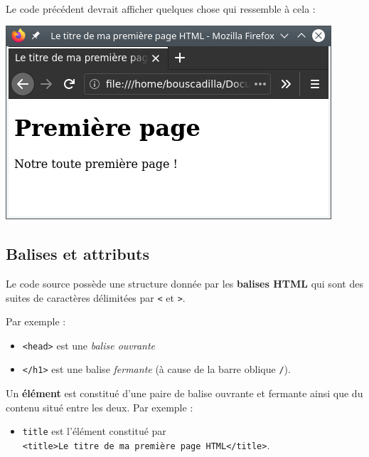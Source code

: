 \documentclass[a4paper,17pt]{extarticle}
\let\origfigure\figure
\let\endorigfigure\endfigure
\renewenvironment{figure}[1][2] {
    \expandafter\origfigure\expandafter[H]
} {
    \endorigfigure
}
\newenvironment{eleve}%
{\begin{activite}\color{noiramu}\\}
{\end{activite}}
\providecommand{\tightlist}{%
      \setlength{\itemsep}{0pt}\setlength{\parskip}{0pt}}
\begin{document}
\begin{eleve}
        \end{eleve}\begin{reponse}
    Le code précédent devrait afficher quelques chose qui ressemble à cela :

\begin{figure}
\centering
\includegraphics{res/premier_exemple.png}
\caption{Capture d'écran du premier exemple}
\end{figure}

            \end{reponse}
    \hypertarget{balises-et-attributs}{%
\subsection{Balises et attributs}\label{balises-et-attributs}}

    Le code source possède une structure donnée par les \textbf{balises
HTML} qui sont des suites de caractères délimitées par
\texttt{\textless{}} et \texttt{\textgreater{}}.

Par exemple :

\begin{itemize}
\tightlist
\item
  \texttt{\textless{}head\textgreater{}} est une \emph{balise ouvrante}
\item
  \texttt{\textless{}/h1\textgreater{}} est une balise \emph{fermante}
  (à cause de la barre oblique \texttt{/}).
\end{itemize}

Un \textbf{élément} est constitué d'une paire de balise ouvrante et
fermante ainsi que du contenu situé entre les deux. Par exemple :

\begin{itemize}
\tightlist
\item
  \texttt{title} est l'élément constitué par
  \texttt{\textless{}title\textgreater{}Le\ titre\ de\ ma\ première\ page\ HTML\textless{}/title\textgreater{}}.
\end{itemize}
\end{document}

